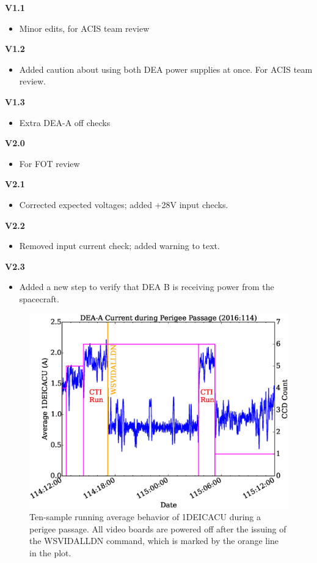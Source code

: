 \documentclass[11pt]{article}
\begin{document}
{\bf V1.1}
\begin{itemize}
\item Minor edits, for ACIS team review
\end{itemize}

{\bf V1.2}
\begin{itemize}
\item Added caution about using both DEA power supplies at once. 
For ACIS team review.
\end{itemize}

{\bf V1.3}
\begin{itemize}
\item Extra DEA-A off checks
\end{itemize}

{\bf V2.0}
\begin{itemize}
\item For FOT review
\end{itemize}

{\bf V2.1}
\begin{itemize}
\item Corrected expected voltages; added +28V input checks.
\end{itemize}

{\bf V2.2}
\begin{itemize}
\item Removed input current check; added warning to text.
\end{itemize}

{\bf V2.3}
\begin{itemize}
\item Added a new step to verify that DEA B is receiving power from the spacecraft.
\end{itemize}

\begin{landscape}
\begin{figure}
\begin{center}
\includegraphics[width=1.2\textwidth]{deaa_on_fig1.eps}
\caption{Ten-sample running average behavior of 1DEICACU during a perigee passage.
All video boards are powered off after the issuing of the WSVIDALLDN command,
which is marked by the orange line in the plot.}
\end{center}
\end{figure}
\end{landscape}
\end{document}

